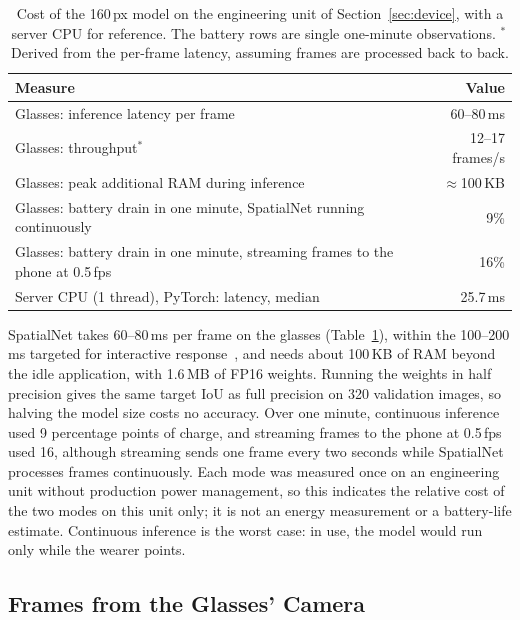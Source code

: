 \begin{table}[t]
  \caption{Cost of the 160\,px model on the engineering unit of Section~\ref{sec:device}, with a server CPU for reference. The battery rows are single one-minute observations. $^\ast$\,Derived from the per-frame latency, assuming frames are processed back to back.}
  \label{tab:device}
  \footnotesize
  \begin{tabular}{lr}
    \toprule
    Measure & Value \\
    \midrule
    Glasses: inference latency per frame & 60--80\,ms \\
    Glasses: throughput$^\ast$ & 12--17 frames/s \\
    Glasses: peak additional RAM during inference & ${\approx}$100\,KB \\
    Glasses: battery drain in one minute, SpatialNet running continuously & 9\% \\
    Glasses: battery drain in one minute, streaming frames to the phone at 0.5\,fps & 16\% \\
    \midrule
    Server CPU (1 thread), PyTorch: latency, median & 25.7\,ms \\
    \bottomrule
  \end{tabular}
\end{table}

SpatialNet takes 60--80\,ms per frame on the glasses (Table~\ref{tab:device}), within the 100--200\,ms targeted for interactive response~\cite{miller1968response,card1991information}, and needs about 100\,KB of RAM beyond the idle application, with 1.6\,MB of FP16 weights. Running the weights in half precision gives the same target IoU as full precision on 320 validation images, so halving the model size costs no accuracy. Over one minute, continuous inference used 9 percentage points of charge, and streaming frames to the phone at 0.5\,fps used 16, although streaming sends one frame every two seconds while SpatialNet processes frames continuously. Each mode was measured once on an engineering unit without production power management, so this indicates the relative cost of the two modes on this unit only; it is not an energy measurement or a battery-life estimate. Continuous inference is the worst case: in use, the model would run only while the wearer points.

\subsection{Frames from the Glasses' Camera}\label{sec:realframes}

